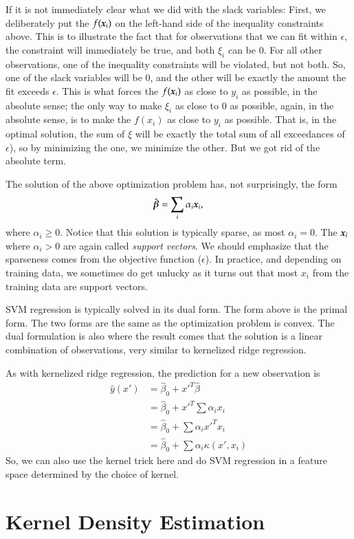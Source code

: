 \begin{refsection}
If it is not immediately clear what we did with the slack variables: First, we deliberately put the  $f(\boldsymbol{x}_i)$ on the left-hand side of the inequality constraints above. This is to illustrate the fact that for observations that we can fit within $\epsilon$, the constraint will immediately be true, and both $\xi_i$ can be 0. For all other observations, one of the inequality constraints will be violated, but not both. So, one of the slack variables will be 0, and the other will be exactly the amount the fit exceeds $\epsilon$. This is what forces the $f(\boldsymbol{x}_i)$ as close to $y_i$ as possible, in the absolute sense; the only way to make $\xi_i$ as close to 0 as possible, again, in the absolute sense, is to make the $f(x_i)$ as close to $y_i$ as possible. That is, in the optimal solution, the sum of $\xi$ will be exactly the total sum of all exceedances of $\epsilon$), so by minimizing the one, we minimize the other. But we got rid of the absolute term.

The solution of the above optimization problem \citep{2012-Murphy} has, not surprisingly, the form
$$\hat{\boldsymbol{\beta}} = \sum_i \alpha_i \boldsymbol{x}_i,$$
%
where $\alpha_i \geq 0$. Notice that this solution is typically sparse, as most $\alpha_i = 0$. The $\boldsymbol{x}_i$ where $\alpha_i > 0$ are again called \emph{support vectors}. We should emphasize that the sparseness comes from the objective function ($\epsilon$). In practice, and depending on training data, we sometimes do get unlucky as it turns out that most $x_i$ from the training data are support vectors.

SVM regression is typically solved in its dual form. The form above is the primal form. The two forms are the same as the optimization problem is convex. The dual formulation is also where the result comes that the solution is a linear combination of observations, very similar to kernelized ridge regression.

As with kernelized ridge regression, the prediction for a new observation is
\begin{align*}
\hat{y}(x') & = \hat{\beta}_0 + x'^T\hat{\beta} \\
& = \hat{\beta}_0 + x'^T\sum \alpha_i x_i \\
& = \hat{\beta}_0 + \sum \alpha_i x'^Tx_i \\
& =  \hat{\beta}_0 + \sum \alpha_i \kappa(x', x_i)
\end{align*}
So, we can also use the kernel trick here and do SVM regression in a feature space determined by the choice of kernel.

\section*{Kernel Density Estimation}


\end{refsection}
